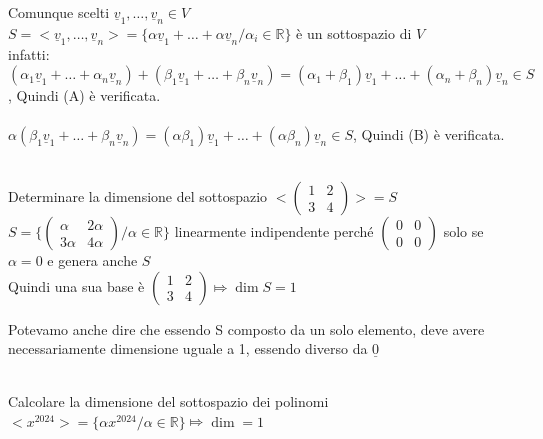 \begin{proposizione}
	\phantom{text}\\
	Comunque scelti $\underline{v}_1,\dots,\underline{v}_n\in V$\\
	$S=<\underline{v}_1,\dots,\underline{v}_n>=\{\alpha\underline{v}_1+\dots+\alpha\underline{v}_n/\alpha_i\in\mathbb{R}\}$ è un sottospazio di $V$\\
	infatti: $(\alpha_1\underline{v}_1+\dots+\alpha_n\underline{v}_n)+(\beta_1\underline{v}_1+\dots+\beta_n\underline{v}_n)=(\alpha_1+\beta_1)\underline{v}_1+\dots+(\alpha_n+\beta_n)\underline{v}_n\in S$, Quindi (A) è verificata.\\\\
	$\alpha(\beta_1\underline{v}_1+\dots+\beta_n\underline{v}_n)=(\alpha\beta_1)\underline{v}_1+\dots+(\alpha\beta_n)\underline{v}_n\in S$, Quindi (B) è verificata.
\end{proposizione}

\begin{es}
	\phantom{text}\\
	Determinare la dimensione del sottospazio $<\begin{pmatrix}
		1&2\\
		3&4
	\end{pmatrix}>=S$\\
	$S=\{\begin{pmatrix}
	       \alpha& 2\alpha\\
		   3\alpha& 4\alpha
	     \end{pmatrix}/ \alpha\in\mathbb{R}\}$ linearmente indipendente perché $\begin{pmatrix}
			0&0\\
			0&0
		 \end{pmatrix}$ solo se $\alpha=0$ e genera anche $S$\\
		 Quindi una sua base è $\begin{pmatrix}
			1&2\\
			3&4
		 \end{pmatrix}\Mapsto\dim S=1$
		 \begin{nota}
			Potevamo anche dire che essendo S composto da un solo elemento, deve avere necessariamente dimensione uguale a 1, essendo diverso da $\underline{0}$
		 \end{nota}
\end{es}

\begin{es}
	\phantom{text}\\
	Calcolare la dimensione del sottospazio dei polinomi $<x^{2024}>=\{\alpha x^{2024}/\alpha\in\mathbb{R}\}\Mapsto\dim =1$
\end{es}


